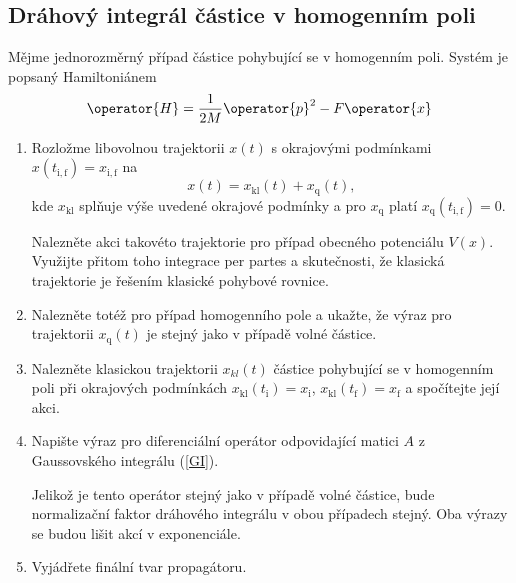 \subsection{Dráhový integrál částice v homogenním poli}
Mějme jednorozměrný případ částice pohybující se v homogenním poli.
Systém je popsaný Hamiltoniánem
\begin{equation}
\operator{H}=\frac{1}{2M}\operator{p}^{2}-F\operator{x}
\end{equation}

\begin{enumerate}
    \item Rozložme libovolnou trajektorii $x(t)$ s okrajovými podmínkami $x(t_{\mathrm{i,f}})=x_{\mathrm{i,f}}$ na 
    \begin{equation}
    x(t)=x_{\mathrm{kl}}(t)+x_{\mathrm{q}}(t),
    \end{equation}
    kde $x_{\mathrm{kl}}$ splňuje výše uvedené okrajové podmínky a pro $x_{\mathrm{q}}$ platí $x_{\mathrm{q}}(t_{\mathrm{i,f}})=0$.

    Nalezněte akci takovéto trajektorie pro případ obecného potenciálu $V(x)$.
    Využijte přitom toho integrace per partes a skutečnosti, že klasická trajektorie je řešením klasické pohybové rovnice.

    \item Nalezněte totéž pro případ homogenního pole a ukažte, že výraz pro trajektorii $x_{\mathrm{q}}(t)$ je stejný
    jako v případě volné částice.

    \item Nalezněte klasickou trajektorii $x_{kl}(t)$ částice pohybující se v homogenním poli
    při okrajových podmínkách $x_{\mathrm{kl}}(t_{\mathrm{i}})=x_{\mathrm{i}}$, $x_{\mathrm{kl}}(t_{\mathrm{f}})=x_{\mathrm{f}}$
    a spočítejte její akci.

    \item Napište výraz pro diferenciální operátor odpovidající matici $A$ z Gaussovského integrálu (\ref{GI}).

    Jelikož je tento operátor stejný jako v případě volné částice, bude normalizační faktor dráhového integrálu
    v obou případech stejný. Oba výrazy se budou lišit akcí v exponenciále.

    \item Vyjádřete finální tvar propagátoru.
\end{enumerate}